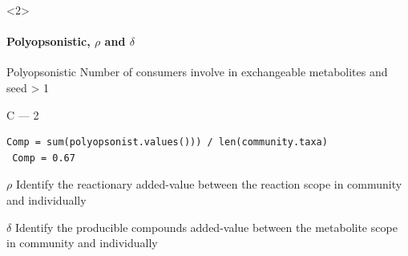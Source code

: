 \documentclass[8pt]{beamer}
\begin{document}
\begin{frame}[fragile]
\begin{onlyenv}<2>
\framesubtitle{Polyopsonistic, $\rho$ and $\delta$}
\begin{minipage}{0.5\textwidth}
\vspace{-1cm}
\begin{exampleblock}{Polyopsonistic}
Number of consumers involve in exchangeable metabolites and seed > 1
\end{exampleblock}{}

C --- 2

\begin{lstlisting}[mathescape=True]
 Comp = sum(polyopsonist.values())) / len(community.taxa)
 Comp = 0.67
\end{lstlisting}

\begin{exampleblock}{$\rho$}
Identify the reactionary added-value between the reaction scope in community and individually
\end{exampleblock}{}

\begin{exampleblock}{$\delta$}
Identify the producible compounds added-value between the metabolite scope in community and individually
\end{exampleblock}{}


\end{minipage}
\end{onlyenv}
\end{frame}
\end{document}
